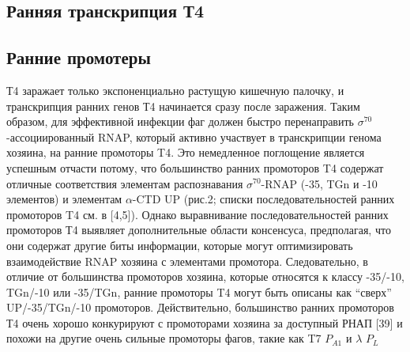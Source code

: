 \documentclass[a4paper,12pt]{article}
\begin{document}
    \subsection{Ранняя транскрипция Т4}
        \subsection{Ранние промотеры}
            \par{Т4 заражает только экспоненциально растущую кишечную палочку, и транскрипция ранних генов Т4 начинается сразу
            после заражения. Таким образом, для эффективной инфекции фаг должен быстро перенаправить
            \(\sigma^{70}\)-ассоциированный RNAP, который активно участвует в транскрипции генома хозяина, на ранние
            промоторы T4. Это немедленное поглощение является успешным отчасти потому, что большинство ранних промоторов
            T4 содержат отличные соответствия элементам распознавания \(\sigma^{70}\)-RNAP (-35, TGn и -10 элементов) и
            элементам \(\alpha\)-CTD UP (рис.2; списки последовательностей ранних промоторов T4 см. в [4,5]). Однако
            выравнивание последовательностей ранних промоторов Т4 выявляет дополнительные области консенсуса,
            предполагая, что они содержат другие биты информации, которые могут оптимизировать взаимодействие RNAP
            хозяина с элементами промотора. Следовательно, в отличие от большинства промоторов хозяина, которые относятся
            к классу -35/-10, TGn/-10 или -35/TGn, ранние промоторы T4 могут быть описаны как “сверх” UP/-35/TGn/-10
            промоторов. Действительно, большинство ранних промоторов Т4 очень хорошо конкурируют с промоторами хозяина за
            доступный РНАП [39] и похожи на другие очень сильные промоторы фагов, такие как T7 \(P_{A1}\) и \(\lambda\)
            $ P_L $}
\end{document}
